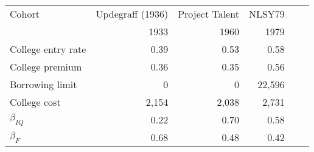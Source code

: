\begin{tabular}{lrrrrr}
\hline
Cohort & Updegraff (1936)  & Project Talent  & NLSY79  &   &   \\ 
  & 1933  & 1960  & 1979  &   &   \\ 
\hline
College entry rate & 0.39  & 0.53  & 0.58  &   &   \\ 
College premium & 0.36  & 0.35  & 0.56  &   &   \\ 
Borrowing limit & 0  & 0  & 22,596  &   &   \\ 
College cost & 2,154  & 2,038  & 2,731  &   &   \\ 
\hline
$\beta_{IQ}$ & 0.22  & 0.70  & 0.58  &   &   \\ 
$\beta_{F}$ & 0.68  & 0.48  & 0.42  &   &   \\ 
\hline
\end{tabular}%
